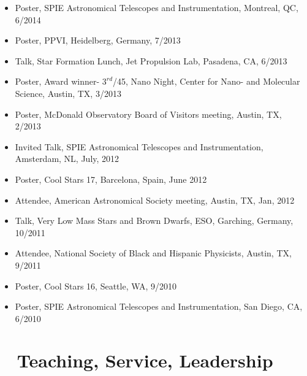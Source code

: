\documentclass[10pt,letterpaper]{article}
\begin{document}
\begin{itemize}
    \item Poster, SPIE Astronomical Telescopes and Instrumentation, Montreal, QC, 6/2014
    \item Poster, PPVI, Heidelberg, Germany, 7/2013
    \item Talk, Star Formation Lunch, Jet Propulsion Lab, Pasadena, CA, 6/2013
    \item Poster, Award winner- $3^{rd}$/45, Nano Night, Center for Nano- and Molecular Science, Austin, TX, 3/2013
    \item Poster, McDonald Observatory Board of Visitors meeting, Austin, TX, 2/2013
    \item Invited Talk, SPIE Astronomical Telescopes and Instrumentation, Amsterdam, NL, July, 2012
    \item Poster, Cool Stars 17, Barcelona, Spain, June 2012
    \item Attendee, American Astronomical Society meeting, Austin, TX, Jan, 2012
    \item Talk, Very Low Mass Stars and Brown Dwarfs, ESO, Garching, Germany, 10/2011
    \item Attendee, National Society of Black and Hispanic Physicists, Austin, TX, 9/2011
    \item Poster, Cool Stars 16, Seattle, WA, 9/2010
    \item Poster, SPIE Astronomical Telescopes and Instrumentation, San Diego, CA, 6/2010
\end{itemize}


\section*{\faChalkboardTeacher ~ Teaching, Service, Leadership}
\end{document}
